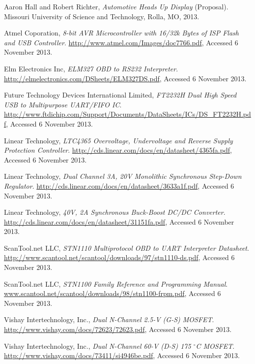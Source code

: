 \begin{thebibliography}{99}

	Aaron Hall and Robert Richter,
	\emph{Automotive Heads Up Display} (Proposal).
	Missouri University of Science and Technology,
	Rolla, MO,
	2013.

	Atmel Coporation,
	\emph{8-bit AVR Microcontroller with 16/32k Bytes of ISP Flash and USB Controller}.
	\url{http://www.atmel.com/Images/doc7766.pdf},
	Accessed 6 November 2013.

	Elm Electronics Inc,
	\emph{ELM327 OBD to RS232 Interpreter}.
	\url{http://elmelectronics.com/DSheets/ELM327DS.pdf},
	Accessed 6 November 2013.

	Future Technology Devices International Limited,
	\emph{FT2232H Dual High Speed USB to Multipurpose UART/FIFO IC}.
	\url{http://www.ftdichip.com/Support/Documents/DataSheets/ICs/DS_FT2232H.pdf},
	Accessed 6 November 2013.

	Linear Technology,
	\emph{LTC4365 Overvoltage, Undervoltage and Reverse Supply Protection Controller}.
	\url{http://cds.linear.com/docs/en/datasheet/4365fa.pdf},
	Accessed 6 November 2013.

	Linear Technology,
	\emph{Dual Channel 3A, 20V Monolithic Synchronous Step-Down Regulator}.
	\url{http://cds.linear.com/docs/en/datasheet/3633a1f.pdf},
	Accessed 6 November 2013.

	Linear Technology,
	\emph{40V, 2A Synchronous Buck-Boost DC/DC Converter}.
	\url{http://cds.linear.com/docs/en/datasheet/31151fa.pdf},
	Accessed 6 November 2013.

	ScanTool.net LLC,
	\emph{STN1110 Multiprotocol OBD to UART Interpreter Datasheet}.
	\url{http://www.scantool.net/scantool/downloads/97/stn1110-ds.pdf},
	Accessed 6 November 2013.

	ScanTool.net LLC,
	\emph{STN1100 Family Reference and Programming Manual}.
	\url{www.scantool.net/scantool/downloads/98/stn1100-frpm.pdf‎},
	Accessed 6 November 2013.

	Vishay Intertechnology, Inc.,
	\emph{Dual N-Channel 2.5-V (G-S) MOSFET}.
	\url{http://www.vishay.com/docs/72623/72623.pdf},
	Accessed 6 November 2013.

	Vishay Intertechnology, Inc.,
	\emph{Dual N-Channel 60-V (D-S) 175 $^\circ$C MOSFET}.
	\url{http://www.vishay.com/docs/73411/si4946be.pdf},
	Accessed 6 November 2013.

\end{thebibliography}
